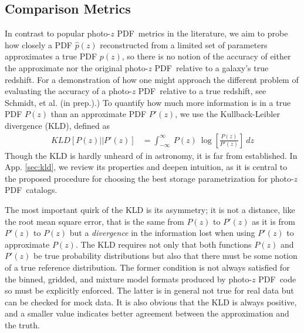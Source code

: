 \documentclass[\docopts]{\docclass}
\newcommand{\pz}{photo-$z$ PDF}
\begin{document}
\subsection{Comparison Metrics}
\label{sec:metric}

In contrast to popular \pz\ metrics in the literature, we aim to probe how 
closely a PDF $\hat{p}(z)$ reconstructed from a limited set of parameters 
approximates a true PDF $p(z)$, so there is no notion of the accuracy of either 
the approximate nor the original \pz\ relative to a galaxy's true redshift.  
For a demonstration of how one might approach the different problem of 
evaluating the accuracy of a \pz\ relative to a true redshift, see Schmidt, et 
al. (in prep.).)  To quantify how much more information is in a true PDF $P(z)$ 
than an approximate PDF $P'(z)$, we use the Kullback-Leibler divergence (KLD), 
defined as
\begin{align}
  \label{eq:kld}
  KLD[P(z) || P'(z)] &= \int_{-\infty}^{\infty}\ P(z)\ 
\log\left[\frac{P(z)}{P'(z)}\right]\ dz
\end{align}
Though the KLD is hardly unheard of in astronomy, it is far from established.  
In App. \ref{sec:kld}, we review its properties and deepen intuition, as it is 
central to the proposed procedure for choosing the best storage parametrization 
for \pz\ catalogs.

The most important quirk of the KLD is its asymmetry; it is not a distance, 
like the root mean square error, that is the same from $P(z)$ to $P'(z)$ as it 
is from $P'(z)$ to $P(z)$ but a \textit{divergence} in the information lost 
when using $P'(z)$ to approximate $P(z)$.  The KLD requires not only that both 
functions $P(z)$ and $P'(z)$ be true probability distributions but also that 
there must be some notion of a true reference distribution.  The former 
condition is not always satisfied for the binned, gridded, and mixture model 
formats produced by \pz\ code so must be explicitly enforced.  The latter is in 
general not true for real data but can be checked for mock data.  It is also 
obvious that the KLD is always positive, and a smaller value indicates better 
agreement between the approximation and the truth.
\end{document}
